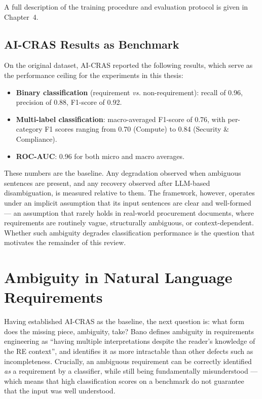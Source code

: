 A full description of the training procedure and evaluation protocol is given in Chapter~4.

\subsection{AI-CRAS Results as Benchmark}

On the original dataset, AI-CRAS reported the following results, which serve as the performance ceiling for the experiments in this thesis:

\begin{itemize}
    \item \textbf{Binary classification} (requirement \textit{vs.} non-requirement): recall of 0.96, precision of 0.88, F1-score of 0.92.
    \item \textbf{Multi-label classification}: macro-averaged F1-score of 0.76, with per-category F1 scores ranging from 0.70 (Compute) to 0.84 (Security \& Compliance).
    \item \textbf{ROC-AUC}: 0.96 for both micro and macro averages.
\end{itemize}

These numbers are the baseline. Any degradation observed when ambiguous sentences are present, and any recovery observed after LLM-based disambiguation, is measured relative to them. The framework, however, operates under an implicit assumption that its input sentences are clear and well-formed — an assumption that rarely holds in real-world procurement documents, where requirements are routinely vague, structurally ambiguous, or context-dependent. Whether such ambiguity degrades classification performance is the question that motivates the remainder of this review.

\section{Ambiguity in Natural Language Requirements}

Having established AI-CRAS as the baseline, the next question is: what form does the missing piece, ambiguity, take? Bano \cite{bano2015ambiguity} defines ambiguity in requirements engineering as ``having multiple interpretations despite the reader's knowledge of the RE context'', and identifies it as more intractable than other defects such as incompleteness. Crucially, an ambiguous requirement can be correctly identified \textit{as} a requirement by a classifier, while still being fundamentally misunderstood — which means that high classification scores on a benchmark do not guarantee that the input was well understood.


